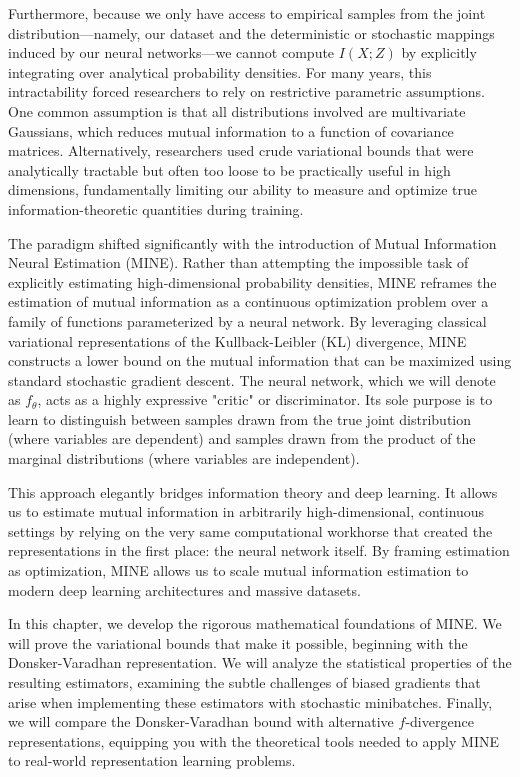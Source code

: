 Furthermore, because we only have access to empirical samples from the joint distribution---namely, our dataset and the deterministic or stochastic mappings induced by our neural networks---we cannot compute $I(X; Z)$ by explicitly integrating over analytical probability densities. For many years, this intractability forced researchers to rely on restrictive parametric assumptions. One common assumption is that all distributions involved are multivariate Gaussians, which reduces mutual information to a function of covariance matrices. Alternatively, researchers used crude variational bounds that were analytically tractable but often too loose to be practically useful in high dimensions, fundamentally limiting our ability to measure and optimize true information-theoretic quantities during training.

The paradigm shifted significantly with the introduction of Mutual Information Neural Estimation (MINE). Rather than attempting the impossible task of explicitly estimating high-dimensional probability densities, MINE reframes the estimation of mutual information as a continuous optimization problem over a family of functions parameterized by a neural network. By leveraging classical variational representations of the Kullback-Leibler (KL) divergence, MINE constructs a lower bound on the mutual information that can be maximized using standard stochastic gradient descent. The neural network, which we will denote as $f_\theta$, acts as a highly expressive "critic" or discriminator. Its sole purpose is to learn to distinguish between samples drawn from the true joint distribution (where variables are dependent) and samples drawn from the product of the marginal distributions (where variables are independent).

This approach elegantly bridges information theory and deep learning. It allows us to estimate mutual information in arbitrarily high-dimensional, continuous settings by relying on the very same computational workhorse that created the representations in the first place: the neural network itself. By framing estimation as optimization, MINE allows us to scale mutual information estimation to modern deep learning architectures and massive datasets.

In this chapter, we develop the rigorous mathematical foundations of MINE. We will prove the variational bounds that make it possible, beginning with the Donsker-Varadhan representation. We will analyze the statistical properties of the resulting estimators, examining the subtle challenges of biased gradients that arise when implementing these estimators with stochastic minibatches. Finally, we will compare the Donsker-Varadhan bound with alternative $f$-divergence representations, equipping you with the theoretical tools needed to apply MINE to real-world representation learning problems.

